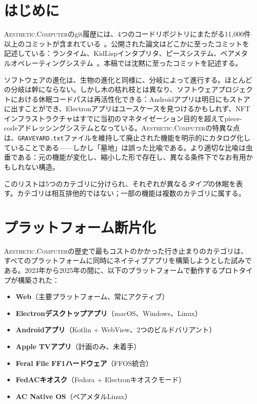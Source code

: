 \documentclass[10pt,letterpaper,twocolumn]{article}
\newcommand{\ac}{\textsc{Aesthetic.Computer}}
\begin{document}
\section{はじめに}

\ac{}のgit履歴には、4つのコードリポジトリにまたがる11,000件以上のコミットが含まれている~\citep{scudder2026archaeology}。公開された論文はどこかに至ったコミットを記述している：ランタイム、KidLispインタプリタ、ピースシステム、ベアメタルオペレーティングシステム~\citep{scudder2026ac, scudder2026os}。本稿では沈黙に至ったコミットを記述する。

ソフトウェアの進化は、生物の進化と同様に、分岐によって進行する。ほとんどの分岐は幹にならない。しかし木の枯れ枝とは異なり、ソフトウェアプロジェクトにおける休眠コードパスは再活性化できる：Androidアプリは明日にもストアに出すことができ、Electronアプリはユースケースを見つけるかもしれず、NFTインフラストラクチャはすでに当初のマネタイゼーション目的を超えてpiece-codeアドレッシングシステムとなっている。\ac{}の特異な点は、\texttt{GRAVEYARD.txt}ファイルを維持して廃止された機能を明示的にカタログ化していることである——しかし「墓地」は誤った比喩である。より適切な比喩は虫垂である：元の機能が変化し、縮小した形で存在し、異なる条件下でなお有用かもしれない構造。

このリストは5つのカテゴリに分けられ、それぞれが異なる\emph{タイプ}の休眠を表す。カテゴリは相互排他的ではない；一部の機能は複数のカテゴリに属する。

\section{プラットフォーム断片化}
\label{sec:fragmentation}

\ac{}の歴史で最もコストのかかった行き止まりのカテゴリは、すべてのプラットフォームに同時にネイティブアプリを構築しようとした試みである。2023年から2025年の間に、以下のプラットフォームで動作するプロトタイプが構築された：

\begin{itemize}
  \item \textbf{Web}（主要プラットフォーム、常にアクティブ）
  \item \textbf{Electronデスクトップアプリ}（macOS、Windows、Linux）
  \item \textbf{Androidアプリ}（Kotlin + WebView、2つのビルドバリアント）
  \item \textbf{Apple TVアプリ}（計画のみ、未着手）
  \item \textbf{Feral File FF1ハードウェア}（FFOS統合）
  \item \textbf{FedACキオスク}（Fedora + Electronキオスクモード）
  \item \textbf{AC Native OS}（ベアメタルLinux）
\end{itemize}
\end{document}
